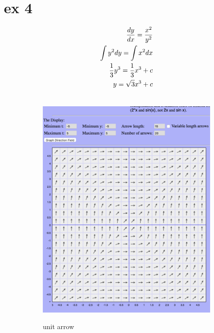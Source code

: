 \documentclass{article}
\begin{document}
\section*{ex 4}
\begin{align}
\begin{split}
    \frac{dy}{dx} = \frac{x^2}{y^2} \\
    \int{y^2}dy = \int{x^2}dx \\
    \frac{1}{3}y^3 = \frac{1}{3}x^3 + c \\
    y = \sqrt{3}{x^3 + c} \\
\notag
\end{split}
\end{align}
\begin{figure}[h!]
    \centering
    \begin{subfigure}[b]{0.4\textwidth}
        \centering
        \includegraphics[width=\textwidth]{./images/x^2=y^2_unit_vector.png} \\
        \caption{unit arrow}
        \label{fig:ksdjfkjx}
    \end{subfigure}
    \begin{subfigure}[b]{0.4\textwidth}

\end{subfigure}
\end{figure}
\end{document}

